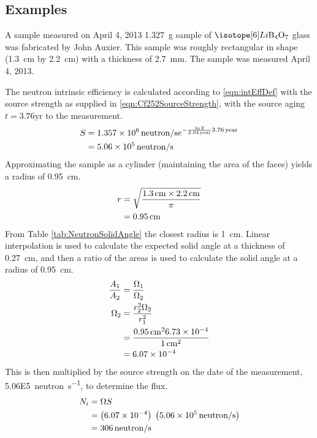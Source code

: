 \documentclass[draftcls,onecolumn]{IEEEtran}
\begin{document}
\subsection{Examples}
\begin{Exercise*}[label={LiBorateGlass},title={Li borate glass},name={Example}]
A sample measured on April 4, 2013 \SI{1.327}{\g} sample of $\iso[6]{Li}\text{B}_4\text{O}_7$ glass was fabricated by John Auxier.
This sample was roughly rectangular in shape (\SI{1.3}{\cm} by \SI{2.2}{\cm}) with a thickness of \SI{2.7}{\mm}.
The sample was measured April 4, 2013.



The neutron intrinsic efficiency is calculated according to \eqref{eqn:intEffDef} with the source strength as supplied in \eqref{eqn:Cf252SourceStrength}, with the source aging $t = 3.76 \text{yr}$ to the measurement.
\begin{align}
    S &= \SI{1.357E6}{neutron\per\second} e^{-\frac{ \ln{2}}{\SI{2.64}{year}}\SI{3.76}{year}} \\ \notag
      &= \SI{5.06E5}{neutron\per\second}
\end{align}
Approximating the sample as a cylinder (maintaining the area of the faces) yields a radius of \SI{0.95}{\cm}.
\begin{align}
	r &= \sqrt{\frac{\SI{1.3}{\cm} \times \SI{2.2}{\cm}}{\pi}} \\ \notag
	& = \SI{0.95}{\cm}
\end{align}
From Table \ref{tab:NeutronSolidAngle} the closest radius is \SI{1}{\cm}.
Linear interpolation is used to calculate the expected solid angle at a thickness of \SI{0.27}{\cm}, and then a ratio of the areas is used to calculate the solid angle at a radius of \SI{0.95}{\cm}.
\begin{align*}
	\frac{A_1}{A_2} &= \frac{\Omega_1}{\Omega_2} \\ 
	\Omega_2 &= \frac{r_2^2 \Omega_2}{r_1^2} \\
	 &= \frac{\SI{0.95}{\cm}^2 \num{6.73E-4}}{\SI{1}{\cm}^2}\\
	 &= \num{6.07E-4}
\end{align*}
This is then multiplied by the source strength on the date of the measurement, \SI{5.06E5}{neutron\per\second}, to determine the flux.
\begin{align*}
 	N_i &= \Omega S \\
	 &= \left (\num{6.07E-4}\right) \;\left( \SI{5.06E5}{neutron\per\second}\right) \\
   &= \SI{306}{neutron\per\second}
\end{align*}


\end{Exercise*}
\end{document}

